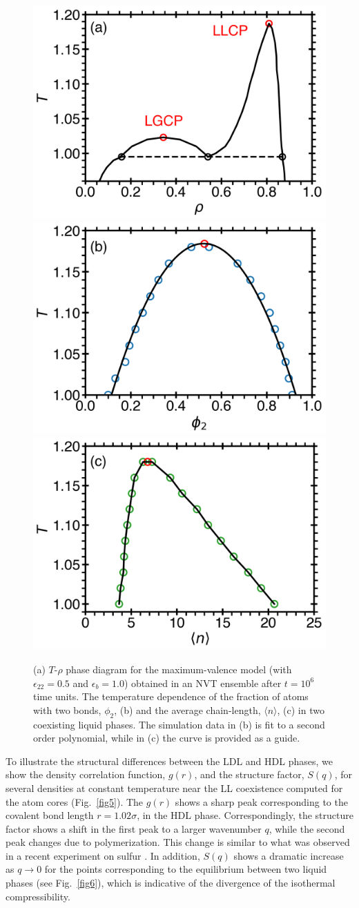\documentclass[9pt,twocolumn,twoside,lineno]{pnas-new}
\begin{document}
\begin{figure}[t]
\centering
{

\includegraphics[width=0.32\linewidth]{Fig3a_Trho.png}
\includegraphics[width=0.32\linewidth]{Fig3b_Tphi2.png}
\includegraphics[width=0.32\linewidth]{Fig3c_Tn.png}
}
\caption{(a) $T$-$\rho$ phase diagram for the maximum-valence model (with $\epsilon_{22}=0.5$ and $\epsilon_b=1.0$) obtained in an NVT ensemble after $t=10^6$ time units. The temperature dependence of the fraction of atoms with two bonds, $\phi_2$, (b) and the average chain-length, $\langle n\rangle$, (c) in two coexisting liquid phases. The simulation data in (b) is fit to a second order polynomial, while in (c) the curve is provided as a guide.}
\label{fig3}
\end{figure}


To illustrate the structural differences between the LDL and HDL phases, we show the density correlation function, $g(r)$, and the structure factor, $S(q)$, for several densities at constant temperature near the LL coexistence computed for the atom cores (Fig.~\ref{fig5}). The $g(r)$ shows a sharp peak corresponding to the covalent bond length $r=1.02\sigma$, in  the HDL phase. Correspondingly, the structure factor shows a shift in the first peak to a larger wavenumber $q$, while the second peak changes due to polymerization. This change is similar to what was observed in a recent experiment on sulfur \cite{Henry2020}. In addition, $S(q)$ shows a dramatic increase as $q\to 0$ for the points corresponding to the equilibrium between two liquid phases (see Fig.~\ref{fig6}), which is indicative of the divergence of the isothermal compressibility.
\end{document}
